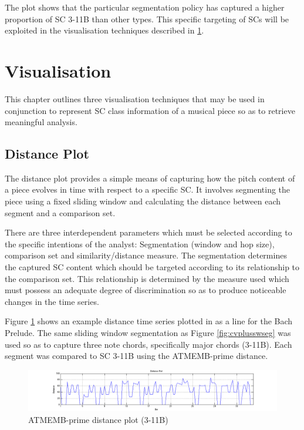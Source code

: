 \documentclass{article}
\begin{document}
The plot shows that the particular segmentation policy has captured a
higher proportion of SC 3-11B than other types. This specific
targeting of SCs will be exploited in the visualisation techniques
described in \ref{sec-9}.
\section{Visualisation}
\label{sec-9}

This chapter outlines three visualisation techniques that may be used
in conjunction to represent SC class information of a musical piece so
as to retrieve meaningful analysis.
\subsection{Distance Plot}
\label{sec-9-1}

The distance plot provides a simple means of capturing how the pitch
content of a piece evolves in time with respect to a specific SC. It
involves segmenting the piece using a fixed sliding window and
calculating the distance between each segment and a comparison set.

There are three interdependent parameters which must be selected
according to the specific intentions of the analyst: Segmentation
(window and hop size), comparison set and similarity/distance
measure. The segmentation determines the captured SC content which
should be targeted according to its relationship to the comparison
set. This relationship is determined by the measure used which must
possess an adequate degree of discrimination so as to produce
noticeable changes in the time series.

Figure \ref{fig:distplot} shows an example distance time series
plotted in as a line for the Bach Prelude. The same sliding window
segmentation as Figure \ref{fig:cvplusswseg} was used so as to capture
three note chords, specifically major chords (3-11B). Each segment was
compared to SC 3-11B using the ATMEMB-prime distance.

\begin{figure}[htb]
\centering
\includegraphics[scale=0.4]{../plots/distplot.png}
\caption{\label{fig:distplot}ATMEMB-prime distance plot (3-11B)}
\end{figure}
\end{document}
